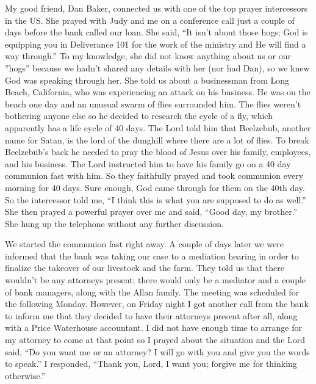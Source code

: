 \documentclass[twoside, 12pt]{book}
\begin{document}
My good friend, Dan Baker, connected us with one of the top prayer intercessors in the US. She prayed with Judy and me on a conference call just a couple of days before the bank called our loan. She said, “It isn't about those hogs; God is equipping you in Deliverance 101 for the work of the ministry and He will find a way through.” To my knowledge, she did not know anything about us or our ”hogs” because we hadn’t shared any details with her (nor had Dan), so we knew God was speaking through her. She told us about a businessman from Long Beach, California, who was experiencing an attack on his business. He was on the beach one day and an unusual swarm of flies surrounded him. The flies weren’t bothering anyone else so he decided to research the cycle of a fly, which apparently has a life cycle of 40 days. The Lord told him that Beelzebub, another name for Satan, is the lord of the dunghill where there are a lot of flies. To break Beelzebub’s back he needed to pray the blood of Jesus over his family, employees, and his business. The Lord instructed him to have his family go on a 40 day communion fast with him. So they faithfully prayed and took communion every morning for 40 days. Sure enough, God came through for them on the 40th day. So the intercessor told me, “I think this is what you are supposed to do as well.” She then prayed a powerful prayer over me and said, “Good day, my brother.” She hung up the telephone without any further discussion.

We started the communion fast right away. A couple of days later we were informed that the bank was taking our case to a mediation hearing in order to finalize the takeover of our livestock and the farm. They told us that there wouldn’t be any attorneys present; there would only be a mediator and a couple of bank managers, along with the Allan family. The meeting was scheduled for the following Monday. However, on Friday night I got another call from the bank to inform me that they decided to have their attorneys present after all, along with a Price Waterhouse accountant. I did not have enough time to arrange for my attorney to come at that point so I prayed about the situation and the Lord said, “Do you want me or an attorney? I will go with you and give you the words to speak.” I responded, “Thank you, Lord, I want you; forgive me for thinking otherwise.”
\end{document}
